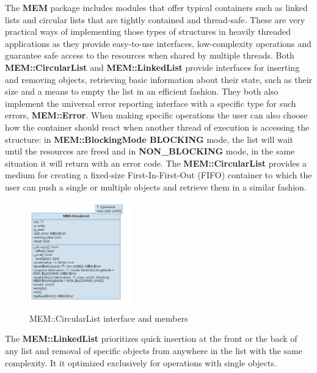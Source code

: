 The \textbf{MEM} package includes modules that offer typical containers such as linked lists and circular lists that are tightly contained and thread-safe. These are very practical ways of implementing those types of structures in heavily threaded applications as they provide easy-to-use interfaces, low-complexity operations and guarantee safe access to the resources when shared by multiple threads. 
\newline
Both \textbf{MEM::CircularList} and \textbf{MEM::LinkedList} provide interfaces for inserting and removing objects, retrieving basic information about their state, such as their size and a means to empty the list in an efficient fashion. They both also implement the universal error reporting interface with a specific type for such errors, \textbf{MEM::Error}. When making specific operations the user can also choose how the container should react when another thread of execution is accessing the structure: in \textbf{MEM::BlockingMode BLOCKING} mode, the list will wait until the resources are freed and in \textbf{NON\_BLOCKING} mode, in the same situation it will return with an error code.
\newline
The \textbf{MEM::CircularList} provides a medium for creating a fixed-size First-In-First-Out (FIFO) container to which the user can push a single or multiple objects and retrieve them in a similar fashion. 

\begin{figure}[H]
	\centering
	\includegraphics[width=0.4\textwidth]{./img/navig-class-circularlist.png}
	\caption {MEM::CircularList interface and members}
	\label{fig:navig-class-circularlist}
	\end{figure}

The \textbf{MEM::LinkedList} prioritizes quick insertion at the front or the back of any list and removal of specific objects from anywhere in the list with the same complexity. It it optimized exclusively for operations with single objects.

